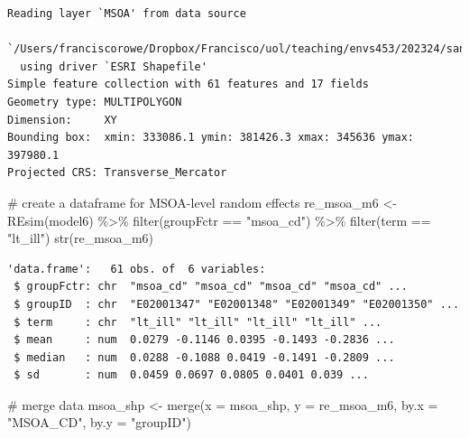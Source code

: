 \documentclass[
  letterpaper,
  DIV=11,
  numbers=noendperiod,
  oneside]{scrreprt}
\newenvironment{Shaded}{\begin{snugshade}}{\end{snugshade}}
\newcommand{\AttributeTok}[1]{\textcolor[rgb]{0.40,0.45,0.13}{#1}}
\newcommand{\CommentTok}[1]{\textcolor[rgb]{0.37,0.37,0.37}{#1}}
\newcommand{\FunctionTok}[1]{\textcolor[rgb]{0.28,0.35,0.67}{#1}}
\newcommand{\NormalTok}[1]{\textcolor[rgb]{0.00,0.23,0.31}{#1}}
\newcommand{\OtherTok}[1]{\textcolor[rgb]{0.00,0.23,0.31}{#1}}
\newcommand{\SpecialCharTok}[1]{\textcolor[rgb]{0.37,0.37,0.37}{#1}}
\newcommand{\StringTok}[1]{\textcolor[rgb]{0.13,0.47,0.30}{#1}}
\begin{document}
\begin{verbatim}
Reading layer `MSOA' from data source 
  `/Users/franciscorowe/Dropbox/Francisco/uol/teaching/envs453/202324/san/data/mlm/MSOA.shp' 
  using driver `ESRI Shapefile'
Simple feature collection with 61 features and 17 fields
Geometry type: MULTIPOLYGON
Dimension:     XY
Bounding box:  xmin: 333086.1 ymin: 381426.3 xmax: 345636 ymax: 397980.1
Projected CRS: Transverse_Mercator
\end{verbatim}

\begin{Shaded}
\begin{Highlighting}[]
\CommentTok{\# create a dataframe for MSOA{-}level random effects}
\NormalTok{re\_msoa\_m6 }\OtherTok{\textless{}{-}} \FunctionTok{REsim}\NormalTok{(model6) }\SpecialCharTok{\%\textgreater{}\%} \FunctionTok{filter}\NormalTok{(groupFctr }\SpecialCharTok{==} \StringTok{"msoa\_cd"}\NormalTok{) }\SpecialCharTok{\%\textgreater{}\%}
  \FunctionTok{filter}\NormalTok{(term }\SpecialCharTok{==} \StringTok{"lt\_ill"}\NormalTok{)}
\FunctionTok{str}\NormalTok{(re\_msoa\_m6)}
\end{Highlighting}
\end{Shaded}

\begin{verbatim}
'data.frame':   61 obs. of  6 variables:
 $ groupFctr: chr  "msoa_cd" "msoa_cd" "msoa_cd" "msoa_cd" ...
 $ groupID  : chr  "E02001347" "E02001348" "E02001349" "E02001350" ...
 $ term     : chr  "lt_ill" "lt_ill" "lt_ill" "lt_ill" ...
 $ mean     : num  0.0279 -0.1146 0.0395 -0.1493 -0.2836 ...
 $ median   : num  0.0288 -0.1088 0.0419 -0.1491 -0.2809 ...
 $ sd       : num  0.0459 0.0697 0.0805 0.0401 0.039 ...
\end{verbatim}

\begin{Shaded}
\begin{Highlighting}[]
\CommentTok{\# merge data}
\NormalTok{msoa\_shp }\OtherTok{\textless{}{-}} \FunctionTok{merge}\NormalTok{(}\AttributeTok{x =}\NormalTok{ msoa\_shp, }\AttributeTok{y =}\NormalTok{ re\_msoa\_m6, }\AttributeTok{by.x =} \StringTok{"MSOA\_CD"}\NormalTok{, }\AttributeTok{by.y =} \StringTok{"groupID"}\NormalTok{)}
\end{Highlighting}
\end{Shaded}
\end{document}
